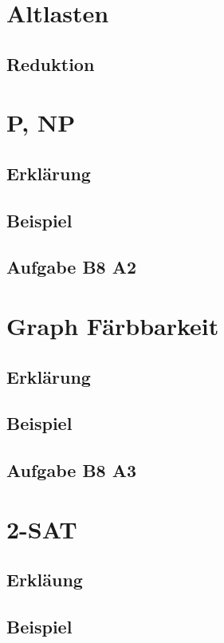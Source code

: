 



\section{Altlasten}
\subsection{Reduktion}

\section{P, NP}
\subsection{Erklärung}
\subsection{Beispiel}
\subsection{Aufgabe B8 A2}

\section{Graph Färbbarkeit}
\subsection{Erklärung}
\subsection{Beispiel}
\subsection{Aufgabe B8 A3}

\section{2-SAT}
\subsection{Erkläung}
\subsection{Beispiel}

